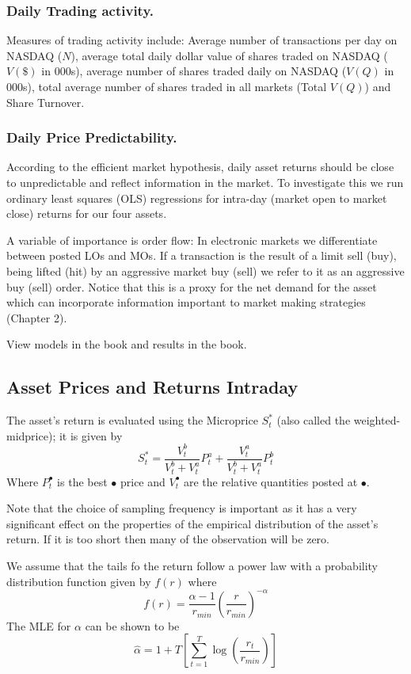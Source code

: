 \documentclass[11pt,a4paper]{article}
\theoremstyle{definition}
\theoremstyle{plain}
\theoremstyle{remark}
\newcommand{\1}{\mathbbm{1}}
\begin{document}
\subsubsection{Daily Trading activity.} 
Measures of trading activity include: 
Average number of transactions per day on NASDAQ ($N$), average total daily dollar value of shares 
traded on NASDAQ ($V(\$)$ in $000$s), average number of shares traded daily on NASDAQ ($V(Q)$ in $000$s), 
total average number of shares traded in all markets (Total $V(Q)$) and Share Turnover. 

\subsubsection{Daily Price Predictability.} 
According to the efficient market hypothesis, daily asset returns should 
be close to unpredictable and reflect information in the market. To investigate 
this we run ordinary least squares (OLS) regressions for intra-day (market open 
to market close) returns for our four assets.

A variable of importance is order flow: In electronic markets we differentiate between 
posted LOs and MOs. If a transaction is the result of a limit sell (buy), being lifted (hit) by an 
aggressive market buy (sell) we refer to it as an aggressive buy (sell) order. 
Notice that this is a proxy for the net demand for the asset which can incorporate information important 
to market making strategies (Chapter 2). 

View models in the book and results in the book. 

\subsection{Asset Prices and Returns Intraday}
The asset's return is evaluated using the Microprice $S^*_t$ (also called the weighted-midprice); 
it is given by 
$$S_t^* = \frac{V_t^b}{V_t^b + V_t^a} P_t^a + \frac{V_t^a}{V_t^b + V_t^a} P_t^b$$
Where $P_t^\bullet$ is the best $\bullet$ price and $V_t^\bullet$ are the relative quantities posted at $\bullet$. 

Note that the choice of sampling frequency is important as it has a very significant effect on the properties of 
the empirical distribution of the asset's return. If it is too short then many of the observation will be zero. 

We assume that the tails fo the return follow a power law with a probability distribution function given by $f(r)$ 
where 
$$f(r) = \frac{\alpha - 1}{r_{min}} \left(\frac{r}{r_{min}}\right)^{-\alpha}$$
The MLE for $\alpha$ can be shown to be 
$$\hat{\alpha} = 1 + T \left[\sum_{t=1}^T \log (\frac{r_t}{r_{min}})\right]$$
\end{document}
